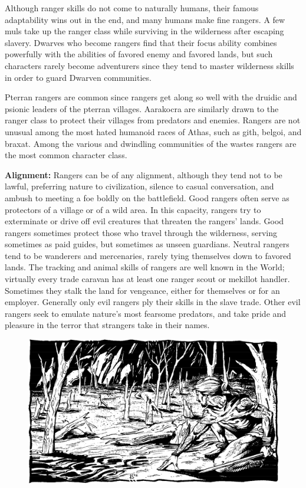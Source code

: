 Although ranger skills do not come to naturally humans, their famous adaptability wins out in the end, and many humans make fine rangers. A few muls take up the ranger class while surviving in the wilderness after escaping slavery. Dwarves who become rangers find that their focus ability combines powerfully with the abilities of favored enemy and favored lands, but such characters rarely become adventurers since they tend to master wilderness skills in order to guard Dwarven communities.

Pterran rangers are common since rangers get along so well with the druidic and psionic leaders of the pterran villages. Aarakocra are similarly drawn to the ranger class to protect their villages from predators and enemies. Rangers are not unusual among the most hated humanoid races of Athas, such as gith, belgoi, and braxat. Among the various and dwindling communities of the wastes rangers are the most common character class.

\textbf{Alignment:} Rangers can be of any alignment, although they tend not to be lawful, preferring nature to civilization, silence to casual conversation, and ambush to meeting a foe boldly on the battlefield. Good rangers often serve as protectors of a village or of a wild area. In this capacity, rangers try to exterminate or drive off evil creatures that threaten the rangers' lands. Good rangers sometimes protect those who travel through the wilderness, serving sometimes as paid guides, but sometimes as unseen guardians. Neutral rangers tend to be wanderers and mercenaries, rarely tying themselves down to favored lands. The tracking and animal skills of rangers are well known in the World; virtually every trade caravan has at least one ranger scout or mekillot handler. Sometimes they stalk the land for vengeance, either for themselves or for an employer. Generally only evil rangers ply their skills in the slave trade. Other evil rangers seek to emulate nature's most fearsome predators, and take pride and pleasure in the terror that strangers take in their names.

\begin{figure}[b!]
\centering
\includegraphics[width=\textwidth-1cm]{images/ranger-2.png}
\WOTC
\end{figure}

